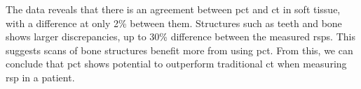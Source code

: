 \documentclass[main.tex]{subfiles}
\begin{document}
The data reveals that there is an agreement between \gls{pct} and \gls{ct} in soft tissue, with a difference at only 2\% between them. Structures such as teeth and bone shows larger discrepancies, up to 30\% difference between the measured \gls{rsp}s. This suggests scans of bone structures benefit more from using \gls{pct}. From this, we can conclude that \gls{pct} shows potential to outperform traditional \gls{ct} when measuring \gls{rsp} in a patient.
\end{document}
